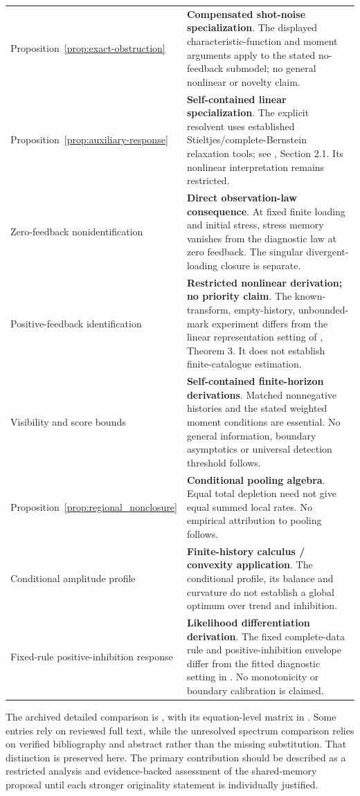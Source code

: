 \begin{longtable}{@{}>{\raggedright\arraybackslash}p{}>{\raggedright\arraybackslash}p{}@{}}
Proposition~\ref{prop:exact-obstruction} & \textbf{Compensated shot-noise specialization}. The displayed characteristic-function and moment arguments apply to the stated no-feedback submodel; no general nonlinear or novelty claim. \\
Proposition~\ref{prop:auxiliary-response} & \textbf{Self-contained linear specialization}. The explicit resolvent uses established Stieltjes/complete-Bernstein relaxation tools; see \citet{MeerschaertToaldo2019}, Section 2.1. Its nonlinear interpretation remains restricted. \\
Zero-feedback nonidentification & \textbf{Direct observation-law consequence}. At fixed finite loading and initial stress, stress memory vanishes from the diagnostic law at zero feedback. The singular divergent-loading closure is separate. \\
Positive-feedback identification & \textbf{Restricted nonlinear derivation; no priority claim}. The known-transform, empty-history, unbounded-mark experiment differs from the linear representation setting of \citet{DavisKresinBaeumerWang2026}, Theorem 3. It does not establish finite-catalogue estimation. \\
Visibility and score bounds & \textbf{Self-contained finite-horizon derivations}. Matched nonnegative histories and the stated weighted moment conditions are essential. No general information, boundary asymptotics or universal detection threshold follows. \\
Proposition~\ref{prop:regional_nonclosure} & \textbf{Conditional pooling algebra}. Equal total depletion need not give equal summed local rates. No empirical attribution to pooling follows. \\
Conditional amplitude profile & \textbf{Finite-history calculus / convexity application}. The conditional profile, its balance and curvature do not establish a global optimum over trend and inhibition. \\
Fixed-rule positive-inhibition response & \textbf{Likelihood differentiation derivation}. The fixed complete-data rule and positive-inhibition envelope differ from the fitted diagnostic setting in \citet{KlingVetter2024}. No monotonicity or boundary calibration is claimed. \\
\bottomrule
\end{longtable}

The archived detailed comparison is , with its equation-level matrix in . Some entries rely on reviewed full text, while the unresolved spectrum comparison relies on verified bibliography and abstract rather than the missing substitution. That distinction is preserved here. The primary contribution should be described as a restricted analysis and evidence-backed assessment of the shared-memory proposal until each stronger originality statement is individually justified.
